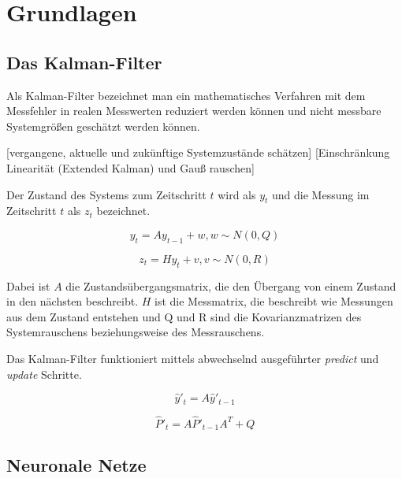 \chapter{Grundlagen}




\section{Das Kalman-Filter}
Als Kalman-Filter bezeichnet man ein mathematisches Verfahren mit dem Messfehler in realen Messwerten reduziert werden können und nicht messbare Systemgrößen geschätzt werden können. 


[vergangene, aktuelle und zukünftige Systemzustände schätzen]
[Einschränkung Linearität (Extended Kalman) und Gauß rauschen]

Der Zustand des Systems zum Zeitschritt $t$ wird als $y_t$ und die Messung im Zeitschritt $t$ als $z_t$ bezeichnet.

\begin{equation}
	y_t = A y_{t-1} + w, 	w \sim N(0, Q)
\end{equation}

\begin{equation}
	z_t = H y_{t} + v, 	v \sim N(0, R)
\end{equation}

Dabei ist $A$ die Zustandsübergangsmatrix, die den Übergang von einem Zustand in den nächsten beschreibt.
$H$ ist die Messmatrix, die beschreibt wie Messungen aus dem Zustand entstehen und Q und R sind die Kovarianzmatrizen des Systemrauschens beziehungsweise des Messrauschens. 

Das Kalman-Filter funktioniert mittels abwechselnd ausgeführter \textit{predict} und \textit{update} Schritte.

\begin{equation}
\hat{y}'_t = A \hat{y}'_{t-1}
\end{equation}

\begin{equation}
	\hat{P}'_t = A \hat{P}'_{t-1} A^\textit{T} + Q
\end{equation}




\section{Neuronale Netze}


